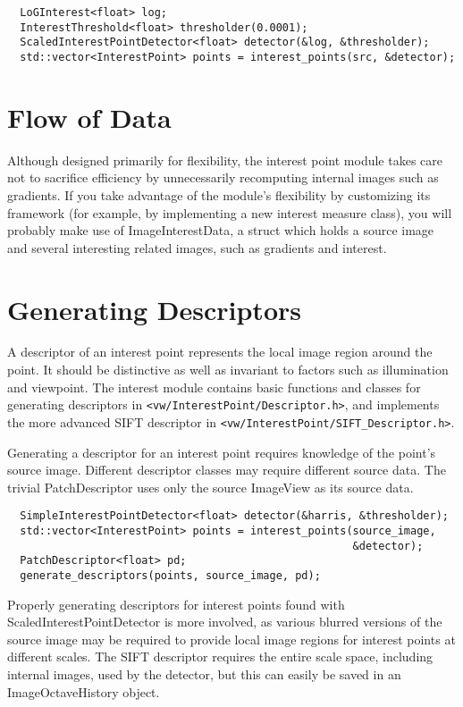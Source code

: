 \begin{verbatim}
  LoGInterest<float> log;
  InterestThreshold<float> thresholder(0.0001);
  ScaledInterestPointDetector<float> detector(&log, &thresholder);
  std::vector<InterestPoint> points = interest_points(src, &detector);
\end{verbatim}

\section{Flow of Data}
Although designed primarily for flexibility, the interest point
module takes care not to sacrifice efficiency by unnecessarily
recomputing internal images such as gradients. If you take
advantage of the module's flexibility by customizing its
framework (for example, by implementing a new interest measure
class), you will probably make use of ImageInterestData, a
struct which holds a source image and several interesting
related images, such as gradients and interest.

\section{Generating Descriptors}
A descriptor of an interest point represents the local image region
around the point. It should be distinctive as well as invariant to
factors such as illumination and viewpoint. The interest module
contains basic functions and classes for generating descriptors
in {\tt <vw/InterestPoint/Descriptor.h>}, and implements the
more advanced SIFT descriptor \cite{lowe04}
in {\tt <vw/InterestPoint/SIFT_Descriptor.h>}.

Generating a descriptor for an interest point requires knowledge
of the point's source image. Different descriptor classes may
require different source data. The trivial PatchDescriptor
uses only the source ImageView as its source data.

\begin{verbatim}
  SimpleInterestPointDetector<float> detector(&harris, &thresholder);
  std::vector<InterestPoint> points = interest_points(source_image,
                                                      &detector);
  PatchDescriptor<float> pd;
  generate_descriptors(points, source_image, pd);
\end{verbatim}

Properly generating descriptors for interest points found with
ScaledInterestPointDetector is more involved, as various
blurred versions of the source image may be required to provide
local image regions for interest points at different scales.
The SIFT descriptor requires the entire scale space, including
internal images, used by the detector, but this can easily
be saved in an ImageOctaveHistory object.

